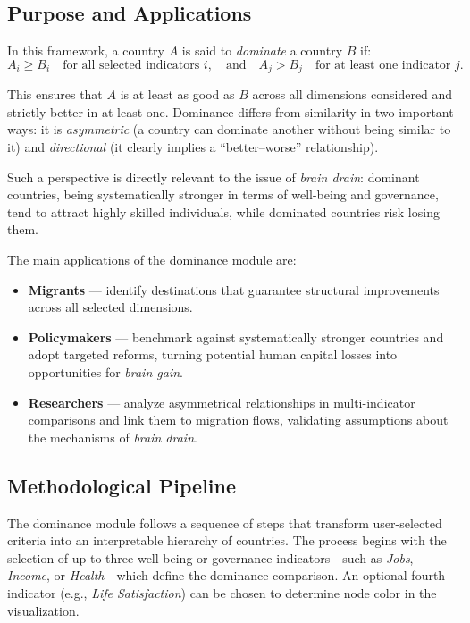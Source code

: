 \documentclass[11pt]{article}
\begin{document}
\subsection{Purpose and Applications}

\noindent
In this framework, a country $A$ is said to \textit{dominate} a country $B$ if:
\[
A_{i} \geq B_{i} \quad \text{for all selected indicators } i, 
\quad \text{and} \quad A_{j} > B_{j} \quad \text{for at least one indicator } j.
\]

\noindent
This ensures that $A$ is at least as good as $B$ across all dimensions considered and strictly better in at least one.  
Dominance differs from similarity in two important ways: it is \textit{asymmetric} (a country can dominate another without being similar to it) and \textit{directional} (it clearly implies a ``better--worse'' relationship).  

\medskip
\noindent
Such a perspective is directly relevant to the issue of \textit{brain drain}: dominant countries, being systematically stronger in terms of well-being and governance, tend to attract highly skilled individuals, while dominated countries risk losing them.  

\medskip
\noindent
The main applications of the dominance module are: 
\begin{itemize}
    \item \textbf{Migrants} --- identify destinations that guarantee structural improvements across all selected dimensions.
    \item \textbf{Policymakers} --- benchmark against systematically stronger countries and adopt targeted reforms, turning potential human capital losses into opportunities for \textit{brain gain}.
    \item \textbf{Researchers} --- analyze asymmetrical relationships in multi-indicator comparisons and link them to migration flows, validating assumptions about the mechanisms of \textit{brain drain}.
\end{itemize}


\subsection{Methodological Pipeline}

\noindent
The dominance module follows a sequence of steps that transform user-selected criteria into an interpretable hierarchy of countries.  
The process begins with the selection of up to three well-being or governance indicators—such as \emph{Jobs}, \emph{Income}, or \emph{Health}—which define the dominance comparison. An optional fourth indicator (e.g., \emph{Life Satisfaction}) can be chosen to determine node color in the visualization.
\end{document}
